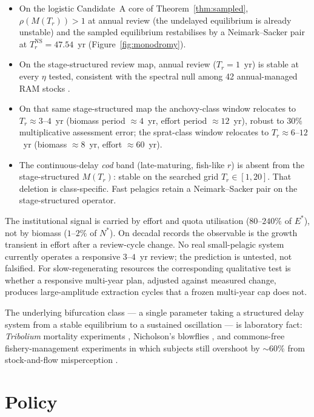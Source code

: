 \documentclass[11pt]{article}
\theoremstyle{definition}
\begin{document}
\begin{itemize}
\item On the logistic Candidate~A core of Theorem~\ref{thm:sampled}, $\rho(M(T_r))>1$ at annual review (the undelayed equilibrium is already unstable) and the sampled equilibrium restabilises by a Neimark--Sacker pair at $T_r^{\mathrm{NS}}=47.54$~yr (Figure~\ref{fig:monodromy}).
\item On the stage-structured review map, annual review ($T_r=1$~yr) is stable at every $\eta$ tested, consistent with the spectral null among 42 annual-managed RAM stocks \cite{ricard2012}.
\item On that same stage-structured map the anchovy-class window relocates to $T_r\approx 3$--$4$~yr (biomass period $\approx 4$~yr, effort period $\approx 12$~yr), robust to $30\%$ multiplicative assessment error; the sprat-class window relocates to $T_r\approx 6$--$12$~yr (biomass $\approx 8$~yr, effort $\approx 60$~yr).
\item The continuous-delay \emph{cod} band (late-maturing, fish-like $r$) is absent from the stage-structured $M(T_r)$: stable on the searched grid $T_r\in[1,20]$. That deletion is class-specific. Fast pelagics retain a Neimark--Sacker pair on the stage-structured operator.
\end{itemize}

The institutional signal is carried by effort and quota utilisation ($80$--$240\%$ of $E^*$), not by biomass ($1$--$2\%$ of $N^*$). On decadal records the observable is the growth transient in effort after a review-cycle change. No real small-pelagic system currently operates a responsive $3$--$4$~yr review; the prediction is untested, not falsified. For slow-regenerating resources the corresponding qualitative test is whether a responsive multi-year plan, adjusted against measured change, produces large-amplitude extraction cycles that a frozen multi-year cap does not.

The underlying bifurcation class --- a single parameter taking a structured delay system from a stable equilibrium to a sustained oscillation --- is laboratory fact: \emph{Tribolium} mortality experiments \cite{costantino1995}, Nicholson's blowflies \cite{gurney1980}, and commons-free fishery-management experiments in which subjects still overshoot by $\sim 60\%$ from stock-and-flow misperception \cite{moxnes1998,cronin2009}.

\section{Policy}
\label{sec:policy}
\end{document}
